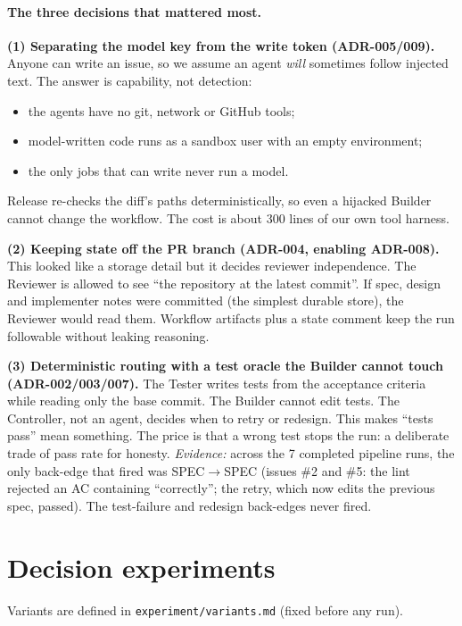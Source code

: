 \documentclass[10pt,a4paper]{article}
\newcommand{\code}[1]{\texttt{#1}}
\begin{document}
\paragraph{The three decisions that mattered most.}
\textbf{(1) Separating the model key from the write token (ADR-005/009).} Anyone can write an
issue, so we assume an agent \emph{will} sometimes follow injected text. The answer is capability,
not detection:
\begin{itemize}
\item the agents have no git, network or GitHub tools;
\item model-written code runs as a sandbox user with an empty environment;
\item the only jobs that can write never run a model.
\end{itemize}
Release re-checks the diff's paths deterministically, so even a hijacked Builder cannot change the
workflow. The cost is about 300 lines of our own tool harness.

\textbf{(2) Keeping state off the PR branch (ADR-004, enabling ADR-008).} This looked like a storage
detail but it decides reviewer independence. The Reviewer is allowed to see ``the repository at the
latest commit''. If spec, design and implementer notes were committed (the simplest durable store),
the Reviewer would read them. Workflow artifacts plus a state comment keep the run followable without
leaking reasoning.

\textbf{(3) Deterministic routing with a test oracle the Builder cannot touch (ADR-002/003/007).}
The Tester writes tests from the acceptance criteria while reading only the base commit. The Builder
cannot edit tests. The Controller, not an agent, decides when to retry or redesign. This makes
``tests pass'' mean something. The price is that a wrong test stops the run: a deliberate trade
of pass rate for honesty. \emph{Evidence:} across the 7 completed pipeline runs, the only back-edge
that fired was SPEC$\to$SPEC (issues \#2 and \#5: the lint rejected an AC containing ``correctly''; the
retry, which now edits the previous spec, passed). The test-failure and redesign back-edges never fired.

\section{Decision experiments}
Variants are defined in \code{experiment/variants.md} (fixed before any run).
\end{document}
